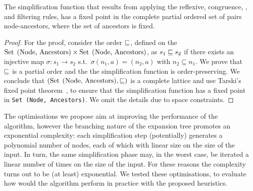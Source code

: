 \begin{theorem}
  \label{thm:fixed_point}
  The simplification function that results from applying the
  reflexive, congruence, \BPA, and filtering rules, has a fixed point
  in the complete partial ordered set of pairs node-ancestors, where
  the set of ancestors is 
  fixed.
\end{theorem}
%
\begin{proof}
For the proof, consider the order $\sqsubseteq$, defined on the
  $\text{\lstinline{Set (Node, Ancestors)}} \times
  \text{\lstinline{Set (Node, Ancestors)}}$, as $s_1 \sqsubseteq s_2$ if
  there exists an injective map
  $\sigma : s_1 \rightarrow s_2$ s.t.\ $\sigma(n_1,a) = (n_2,a)$ with
  $n_2\subseteq n_1$. We prove that $\sqsubseteq$ is a partial order and the 
  the simplification function is order-preserving. 
  We conclude that $(\text{\lstinline{Set (Node, Ancestors)}}, \leqSets)$ is
  a complete lattice and use Tarski's fixed point 
  theorem~\cite{tarski1955lattice}, to
  ensure that the simplification function has a fixed point in
  \lstinline{Set (Node, Ancestors)}.
  We omit the details due to space constraints.
\end{proof}

The optimisations we propose aim at improving the performance of the
algorithm, however the branching nature of the expansion tree promotes
an exponential complexity: each simplification step (potentially)
generates a polynomial number of nodes, each of which with linear size
on the size of the input.  In turn, the same simplification phase may,
in the worst case, be iterated a linear number of times on the size of
the input.  For these reasons the complexity turns out to be (at least)
exponential.  
We tested these optimisations, to evaluate how would the algorithm
perform in practice with the proposed heuristics.



